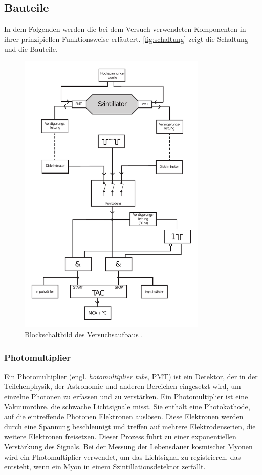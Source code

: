 \subsection*{Bauteile}

In dem Folgenden werden die bei dem Versuch verwendeten Komponenten in ihrer prinzipiellen Funktionsweise erläutert.
\autoref{fig:schaltung} zeigt die Schaltung und die Bauteile.
\begin{figure}
    \centering
    \includegraphics[width=0.8\textwidth]{pictures/schaltung.pdf}
    \caption{Blockschaltbild des Versuchsaufbaus \cite[3]{v01}.}
    \label{fig:schaltung}
\end{figure}


\subsubsection*{Photomultiplier}
Ein Photomultiplier (engl. \textit{hotomultiplier tube}, PMT) ist ein Detektor, der in der Teilchenphysik, 
der Astronomie und anderen Bereichen eingesetzt wird, um einzelne Photonen zu erfassen und zu verstärken. 
Ein Photomultiplier ist eine Vakuumröhre, die schwache Lichtsignale misst. 
Sie enthält eine Photokathode, auf die eintreffende Photonen Elektronen auslösen. 
Diese Elektronen werden durch eine Spannung beschleunigt und treffen auf mehrere Elektrodenserien, 
die weitere Elektronen freisetzen. 
Dieser Prozess führt zu einer exponentiellen Verstärkung des Signals.
Bei der Messung der Lebensdauer kosmischer Myonen wird ein Photomultiplier verwendet, 
um das Lichtsignal zu registrieren, das entsteht, 
wenn ein Myon in einem Szintillationsdetektor zerfällt. 

